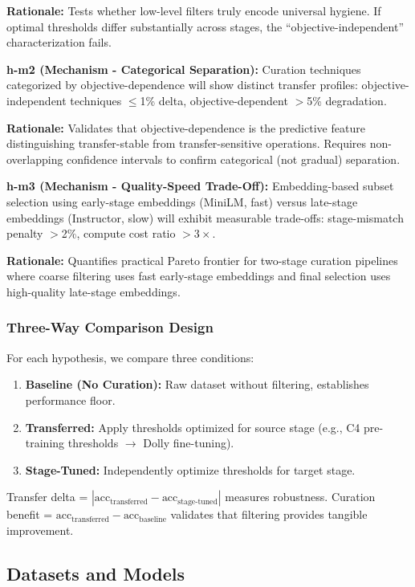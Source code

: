 \textbf{Rationale:} Tests whether low-level filters truly encode universal hygiene. If optimal thresholds differ substantially across stages, the ``objective-independent'' characterization fails.

\textbf{h-m2 (Mechanism - Categorical Separation):} Curation techniques categorized by objective-dependence will show distinct transfer profiles: objective-independent techniques $\leq$1\% delta, objective-dependent $>$5\% degradation.

\textbf{Rationale:} Validates that objective-dependence is the predictive feature distinguishing transfer-stable from transfer-sensitive operations. Requires non-overlapping confidence intervals to confirm categorical (not gradual) separation.

\textbf{h-m3 (Mechanism - Quality-Speed Trade-Off):} Embedding-based subset selection using early-stage embeddings (MiniLM, fast) versus late-stage embeddings (Instructor, slow) will exhibit measurable trade-offs: stage-mismatch penalty $>$2\%, compute cost ratio $>3\times$.

\textbf{Rationale:} Quantifies practical Pareto frontier for two-stage curation pipelines where coarse filtering uses fast early-stage embeddings and final selection uses high-quality late-stage embeddings.

\subsubsection{Three-Way Comparison Design}

For each hypothesis, we compare three conditions:

\begin{enumerate}
\item \textbf{Baseline (No Curation):} Raw dataset without filtering, establishes performance floor.
\item \textbf{Transferred:} Apply thresholds optimized for source stage (e.g., C4 pre-training thresholds $\rightarrow$ Dolly fine-tuning).
\item \textbf{Stage-Tuned:} Independently optimize thresholds for target stage.
\end{enumerate}

Transfer delta = $|\text{acc}_\text{transferred} - \text{acc}_\text{stage-tuned}|$ measures robustness. Curation benefit = $\text{acc}_\text{transferred} - \text{acc}_\text{baseline}$ validates that filtering provides tangible improvement.

\subsection{Datasets and Models}

